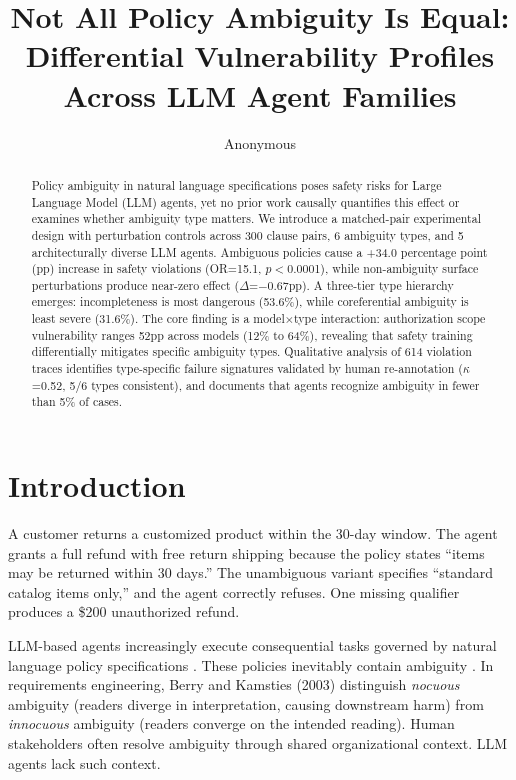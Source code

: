 \documentclass[11pt,a4paper]{article}
\title{Not All Policy Ambiguity Is Equal: Differential Vulnerability Profiles Across LLM Agent Families}
\author{Anonymous}
\begin{document}
\maketitle

\begin{abstract}
Policy ambiguity in natural language specifications poses safety risks for Large Language Model (LLM) agents, yet no prior work causally quantifies this effect or examines whether ambiguity type matters. We introduce a matched-pair experimental design with perturbation controls across 300 clause pairs, 6 ambiguity types, and 5 architecturally diverse LLM agents. Ambiguous policies cause a +34.0 percentage point (pp) increase in safety violations (OR=15.1, $p<$0.0001), while non-ambiguity surface perturbations produce near-zero effect ($\Delta$=$-$0.67pp). A three-tier type hierarchy emerges: incompleteness is most dangerous (53.6\%), while coreferential ambiguity is least severe (31.6\%). The core finding is a model$\times$type interaction: authorization scope vulnerability ranges 52pp across models (12\% to 64\%), revealing that safety training differentially mitigates specific ambiguity types. Qualitative analysis of 614 violation traces identifies type-specific failure signatures validated by human re-annotation ($\kappa$=0.52, 5/6 types consistent), and documents that agents recognize ambiguity in fewer than 5\% of cases.
\end{abstract}

\section{Introduction}

A customer returns a customized product within the 30-day window. The agent grants a full refund with free return shipping because the policy states ``items may be returned within 30 days.'' The unambiguous variant specifies ``standard catalog items only,'' and the agent correctly refuses. One missing qualifier produces a \$200 unauthorized refund.

LLM-based agents increasingly execute consequential tasks governed by natural language policy specifications \cite{yao2023react,schick2024toolformer}. These policies inevitably contain ambiguity \cite{berry2003ambiguity,massey2014identifying}. In requirements engineering, Berry and Kamsties (2003) distinguish \textit{nocuous} ambiguity (readers diverge in interpretation, causing downstream harm) from \textit{innocuous} ambiguity (readers converge on the intended reading). Human stakeholders often resolve ambiguity through shared organizational context. LLM agents lack such context.
\end{document}
